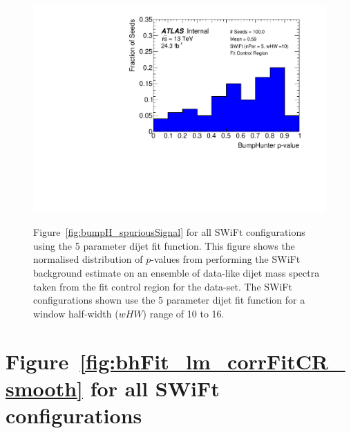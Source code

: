 \begin{figure}[!htb]
{}\hspace{-3mm}                                       
 {                                                    
  \includegraphics[width=0.48\linewidth, angle=0]{figs/Dibjet/LowMass/FitStudy_min566/pVal_bumpHunter_corrFitCR_5para_low10_high10.pdf}
}
\caption[Figure~\ref{fig:bumpH_spuriousSignal} for all SWiFt configurations using the 5 parameter dijet fit function.]
 {\label{fig:app-bumpH_spuriousSignal_5para}
 Figure~\ref{fig:bumpH_spuriousSignal} for all SWiFt configurations using the 5 parameter dijet fit function.
  This figure shows the normalised distribution of \bh{} $p$-values from performing the SWiFt background estimate on an ensemble of
  data-like dijet mass spectra taken from the fit control region for the \lm{} data-set.
  The SWiFt configurations shown use the 5 parameter dijet fit function for a window half-width ($wHW$) range of 10 to 16.
}
\end{figure}

\clearpage
\vspace{2em}
\section{Figure~\ref{fig:bhFit_lm_corrFitCR_smooth} for all SWiFt configurations}
\vspace{3em}


